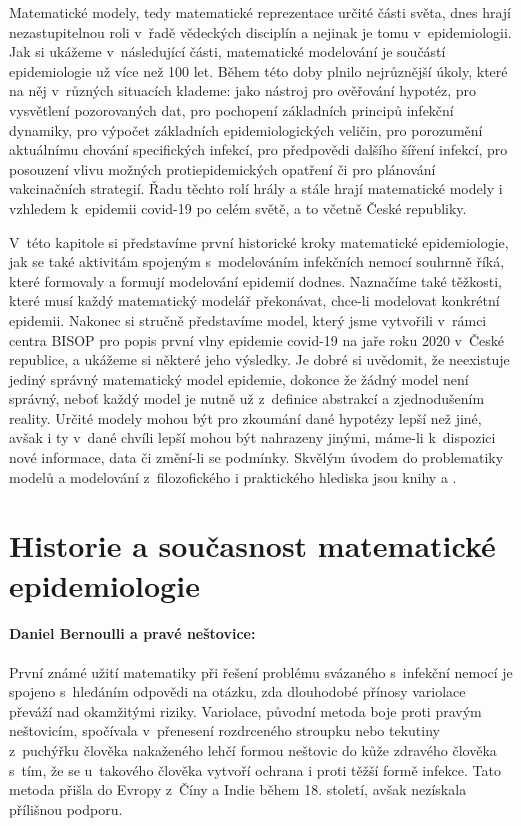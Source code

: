 Matematické modely, tedy matematické reprezentace určité části světa, dnes hrají nezastupitelnou roli v~řadě vědeckých disciplín a nejinak je tomu v~epidemiologii. Jak si ukážeme v~následující části, matematické modelování je součástí epidemiologie už více než 100 let. Během této doby plnilo nejrůznější úkoly, které na něj v~různých situacích klademe: jako nástroj pro ověřování hypotéz, pro vysvětlení pozorovaných dat, pro pochopení základních principů infekční dynamiky, pro výpočet základních epidemiologických veličin, pro porozumění aktuálnímu chování specifických infekcí, pro předpovědi dalšího šíření infekcí, pro posouzení vlivu možných protiepidemických opatření či pro plánování vakcinačních strategií. Řadu těchto rolí hrály a stále hrají matematické modely i vzhledem k~epidemii covid-19 po celém světě, a to včetně České republiky.

V~této kapitole si představíme první historické kroky matematické epidemiologie, jak se také aktivitám spojeným s~modelováním infekčních nemocí souhrnně říká, které formovaly a formují modelování epidemií dodnes. Naznačíme také těžkosti, které musí každý matematický modelář překonávat, chce-li modelovat konkrétní epidemii. Nakonec si stručně představíme model, který jsme vytvořili v~rámci centra BISOP pro popis první vlny epidemie covid-19 na jaře roku 2020 v~České republice, a ukážeme si některé jeho výsledky. Je dobré si uvědomit, že neexistuje jediný správný matematický model epidemie, dokonce že žádný model není správný, neboť každý model je nutně už z~definice abstrakcí a zjednodušením reality. Určité modely mohou být pro zkoumání dané hypotézy lepší než jiné, avšak i ty v~dané chvíli lepší mohou být nahrazeny jinými, máme-li k~dispozici nové informace, data či změní-li se podmínky. Skvělým úvodem do problematiky modelů a modelování z~filozofického i praktického hlediska jsou knihy \cite{GerleeLundh2016} a \cite{HilbornMangel1997}.

\section*{Historie a současnost matematické epidemiologie}


\paragraph{Daniel Bernoulli a pravé neštovice:} První známé užití matematiky při řešení problému svázaného s~infekční nemocí je spojeno s~hledáním odpovědi na otázku, zda dlouhodobé přínosy variolace převáží nad okamžitými riziky. Variolace, původní metoda boje proti pravým neštovicím, spočívala v~přenesení rozdrceného stroupku nebo tekutiny z~puchýřku člověka nakaženého lehčí formou neštovic do kůže zdravého člověka s~tím, že se u~takového člověka vytvoří ochrana i proti těžší formě infekce. Tato metoda přišla do Evropy z~Číny a Indie během 18. století, avšak nezískala přílišnou podporu. 

